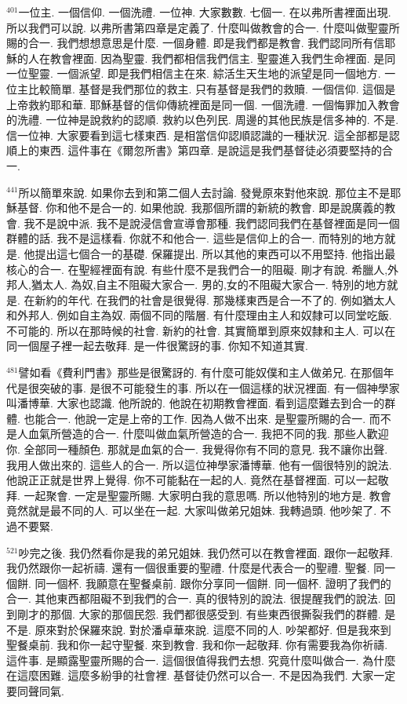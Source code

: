 \documentclass{book}
\begin{document}
$^{401}$一位主.
一個信仰.
一個洗禮.
一位神.
大家數數.
七個一.
在以弗所書裡面出現.
所以我們可以說.
以弗所書第四章是定義了.
什麼叫做教會的合一.
什麼叫做聖靈所賜的合一.
我們想想意思是什麼.
一個身體.
即是我們都是教會.
我們認同所有信耶穌的人在教會裡面.
因為聖靈.
我們都相信我們信主.
聖靈進入我們生命裡面.
是同一位聖靈.
一個派望.
即是我們相信主在來.
綜活生天生地的派望是同一個地方.
一位主比較簡單.
基督是我們那位的救主.
只有基督是我們的救贖.
一個信仰.
這個是上帝救約耶和華.
耶穌基督的信仰傳統裡面是同一個.
一個洗禮.
一個悔罪加入教會的洗禮.
一位神是說救約的認順.
救約以色列民.
周邊的其他民族是信多神的.
不是.
信一位神.
大家要看到這七樣東西.
是相當信仰認順認識的一種狀況.
這全部都是認順上的東西.
這件事在《爾忽所書》第四章.
是說這是我們基督徒必須要堅持的合一.

$^{441}$所以簡單來說.
如果你去到和第二個人去討論.
發覺原來對他來說.
那位主不是耶穌基督.
你和他不是合一的.
如果他說.
我那個所謂的新統的教會.
即是說廣義的教會.
我不是說中派.
我不是說浸信會宣導會那種.
我們認同我們在基督裡面是同一個群體的話.
我不是這樣看.
你就不和他合一.
這些是信仰上的合一.
而特別的地方就是.
他提出這七個合一的基礎.
保羅提出.
所以其他的東西可以不用堅持.
他指出最核心的合一.
在聖經裡面有說.
有些什麼不是我們合一的阻礙.
剛才有說.
希臘人,外邦人,猶太人.
為奴,自主不阻礙大家合一.
男的,女的不阻礙大家合一.
特別的地方就是.
在新約的年代.
在我們的社會是很覺得.
那幾樣東西是合一不了的.
例如猶太人和外邦人.
例如自主為奴.
兩個不同的階層.
有什麼理由主人和奴隸可以同堂吃飯.
不可能的.
所以在那時候的社會.
新約的社會.
其實簡單到原來奴隸和主人.
可以在同一個屋子裡一起去敬拜.
是一件很驚訝的事.
你知不知道其實.

$^{481}$譬如看《費利門書》那些是很驚訝的.
有什麼可能奴僕和主人做弟兄.
在那個年代是很突破的事.
是很不可能發生的事.
所以在一個這樣的狀況裡面.
有一個神學家叫潘博華.
大家也認識.
他所說的.
他說在初期教會裡面.
看到這麼難去到合一的群體.
也能合一.
他說一定是上帝的工作.
因為人做不出來.
是聖靈所賜的合一.
而不是人血氣所營造的合一.
什麼叫做血氣所營造的合一.
我把不同的我.
那些人歡迎你.
全部同一種顏色.
那就是血氣的合一.
我覺得你有不同的意見.
我不讓你出聲.
我用人做出來的.
這些人的合一.
所以這位神學家潘博華.
他有一個很特別的說法.
他說正正就是世界上覺得.
你不可能黏在一起的人.
竟然在基督裡面.
可以一起敬拜.
一起聚會.
一定是聖靈所賜.
大家明白我的意思嗎.
所以他特別的地方是.
教會竟然就是最不同的人.
可以坐在一起.
大家叫做弟兄姐妹.
我轉過頭.
他吵架了.
不過不要緊.

$^{521}$吵完之後.
我仍然看你是我的弟兄姐妹.
我仍然可以在教會裡面.
跟你一起敬拜.
我仍然跟你一起祈禱.
還有一個很重要的聖禮.
什麼是代表合一的聖禮.
聖餐.
同一個餅.
同一個杯.
我願意在聖餐桌前.
跟你分享同一個餅.
同一個杯.
證明了我們的合一.
其他東西都阻礙不到我們的合一.
真的很特別的說法.
很提醒我們的說法.
回到剛才的那個.
大家的那個民怨.
我們都很感受到.
有些東西很撕裂我們的群體.
是不是.
原來對於保羅來說.
對於潘卓華來說.
這麼不同的人.
吵架都好.
但是我來到聖餐桌前.
我和你一起守聖餐.
來到教會.
我和你一起敬拜.
你有需要我為你祈禱.
這件事.
是顯露聖靈所賜的合一.
這個很值得我們去想.
究竟什麼叫做合一.
為什麼在這麼困難.
這麼多紛爭的社會裡.
基督徒仍然可以合一.
不是因為我們.
大家一定要同聲同氣.
\end{document}
